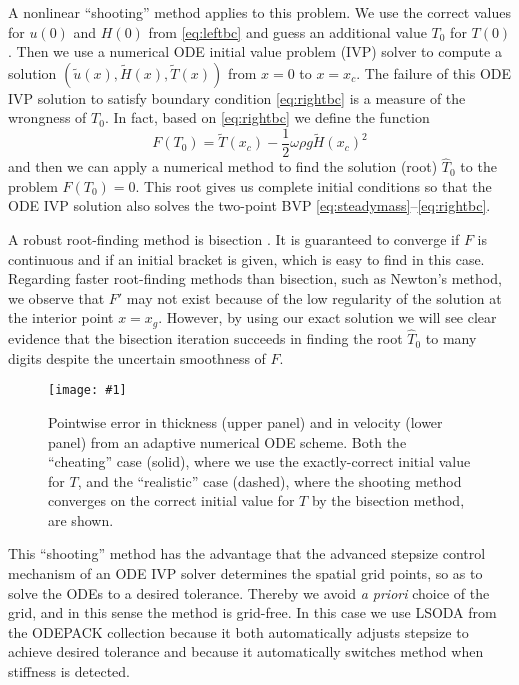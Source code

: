 \documentclass[twocolumn]{igs}
\newcommand{\onecol}[1]{\texttt{[image: \#1]}}
\begin{document}
A nonlinear ``shooting'' method \citep[section 17.1]{Pressetal} applies to this problem.  We use the correct values for $u(0)$ and $H(0)$ from \eqref{eq:leftbc} and guess an additional value $T_0$ for $T(0)$.  Then we use a numerical ODE initial value problem (IVP) solver to compute a solution $(\tilde u(x),\tilde H(x),\tilde T(x))$ from $x=0$ to $x=x_c$.  The failure of this ODE IVP solution to satisfy boundary condition \eqref{eq:rightbc} is a measure of the wrongness of $T_0$.  In fact, based on \eqref{eq:rightbc} we define the function
\begin{equation}
F(T_0) = \tilde T(x_c) - \frac{1}{2} \omega \rho g \tilde H(x_c)^2  \label{eq:Fbisection}
\end{equation}
and then we can apply a numerical method to find the solution (root) $\hat T_0$ to the problem $F(T_0)=0$.  This root gives us complete initial conditions so that the ODE IVP solution also solves the two-point BVP \eqref{eq:steadymass}--\eqref{eq:rightbc}.

A robust root-finding method is bisection \citep[section 9.1]{Pressetal}.  It is guaranteed to converge if $F$ is continuous and if an initial bracket is given, which is easy to find in this case.  Regarding faster root-finding methods than bisection, such as Newton's method, we observe that $F'$ may not exist because of the low regularity of the solution at the interior point $x=x_g$. However, by using our exact solution we will see clear evidence that the bisection iteration succeeds in finding the root $\hat T_0$ to many digits despite the uncertain smoothness of $F$.

\begin{figure}[ht]
\onecol{em-error}
\caption{Pointwise error in thickness (upper panel) and in velocity (lower panel) from an adaptive numerical ODE scheme.  Both the ``cheating'' case (solid), where we use the exactly-correct initial value for $T$, and the ``realistic'' case (dashed), where the shooting method converges on the correct initial value for $T$ by the bisection method, are shown.} \label{fig:shoot-error}
\end{figure}

This ``shooting'' method has the advantage that the advanced stepsize control mechanism of an ODE IVP solver determines the spatial grid points, so as to solve the ODEs to a desired tolerance.  Thereby we avoid \emph{a priori} choice of the grid, and in this sense the method is grid-free.  In this case we use LSODA from the ODEPACK collection \citep{Hindmarsh1983ODEPACK} because it both automatically adjusts stepsize to achieve desired tolerance and because it automatically switches method when stiffness \citep[section 16.6]{Pressetal} is detected.
\end{document}
